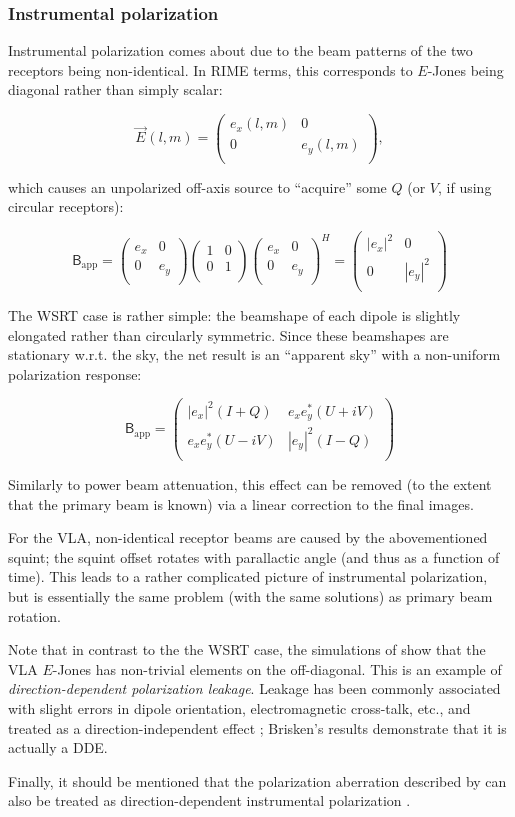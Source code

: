 \documentclass{aa}
\newcommand{\matrixtt}[4]{\left( \begin{array}{cc}#1&#2\\#3&#4\\\end{array} \right)}
\newcommand{\herm}{H}
\newcommand{\jones}[2]{\vec {#1}_{#2}}
\newcommand{\coh}[2]{\mathsf{{#1}}_{{#2}}}
\begin{document}
\subsubsection{Instrumental polarization}

Instrumental polarization comes about due to the beam patterns of the two receptors being non-identical. In RIME terms, this corresponds to $E$-Jones being diagonal rather than simply scalar:

\[
\jones{E}{}(l,m) = \matrixtt{e_x(l,m)}{0}{0}{e_y(l,m)},
\]

which causes an unpolarized off-axis source to ``acquire'' some $Q$ (or $V$, if using circular receptors):

\[
\coh{B}{\mathrm{app}} = \matrixtt{e_x}{0}{0}{e_y} 
\matrixtt{1}{0}{0}{1}
\matrixtt{e_x}{0}{0}{e_y}^\herm =
\matrixtt{|e_x|^2}{0}{0}{|e_y|^2}
\]

The WSRT case is rather simple: the beamshape of each dipole is slightly elongated rather than circularly symmetric. Since these beamshapes are stationary w.r.t. the sky, the net result is an ``apparent sky'' with a non-uniform polarization response: 

\[
\coh{B}{\mathrm{app}} = \matrixtt{|e_x|^2(I+Q)}{e_x e^*_y(U+iV)}{e_x e^*_y(U-iV)}{|e_y|^2(I-Q)}
\]

Similarly to power beam attenuation, this effect can be removed (to the extent that the primary beam is known) via a linear correction to the final images.

For the VLA, non-identical receptor beams are caused by the abovementioned squint; the squint offset rotates with parallactic angle (and thus as a function of time). This leads to a rather complicated picture of instrumental polarization, but is essentially the same problem (with the same solutions) as primary beam rotation.

Note that in contrast to the the WSRT case, the simulations of \citet{Brisken:VLA-beam} show that the VLA $E$-Jones has non-trivial elements on the off-diagonal. This is an example of \emph{direction-dependent polarization leakage}. Leakage has been commonly associated with slight errors in dipole orientation, electromagnetic cross-talk, etc., and treated as a direction-independent effect \citep{ME1,JEN:note185}; Brisken's results demonstrate that it is actually a DDE.

Finally, it should be mentioned that the polarization aberration described by \citet{Carozzi:ME3D} can also be treated as direction-dependent instrumental polarization \citep[see Paper I,][Sect.~5.4]{RRIME1}.
\end{document}
